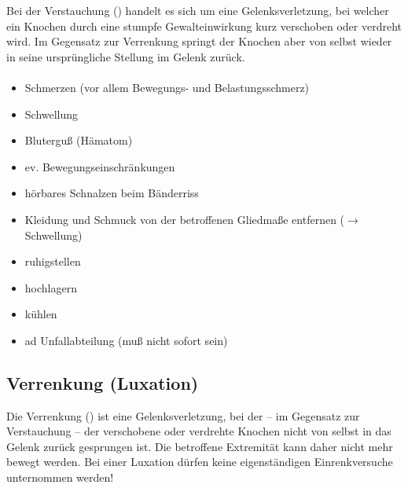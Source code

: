 Bei der Verstauchung () handelt es sich um eine Gelenksverletzung,
bei welcher ein Knochen durch eine stumpfe Gewalteinwirkung kurz verschoben oder
verdreht wird. Im Gegensatz zur Verrenkung springt der Knochen aber von selbst
wieder in seine ursprüngliche Stellung im Gelenk zurück.

\paragraph{\TxSymptome}
\begin{itemize}
  \item Schmerzen (vor allem Bewegungs- und Belastungsschmerz)
  \item Schwellung
  \item Bluterguß (Hämatom)
  \item ev. Bewegungseinschränkungen
  \item hörbares Schnalzen beim Bänderriss
\end{itemize}

{
\begin{itemize}
  \item Kleidung und Schmuck von der betroffenen Gliedmaße entfernen ($\rightarrow$ Schwellung)
  \item ruhigstellen
  \item hochlagern
  \item kühlen
  \item ad Unfallabteilung (muß nicht sofort sein)
\end{itemize}
}





\subsection{Verrenkung (Luxation)}
\label{topic:verrenkung}


Die Verrenkung () ist eine Gelenksverletzung, bei der -- im Gegensatz
zur Verstauchung -- der verschobene oder verdrehte Knochen nicht von selbst in
das Gelenk zurück gesprungen ist. Die betroffene Extremität kann daher nicht mehr
bewegt werden. Bei einer Luxation dürfen keine eigenständigen Einrenkversuche
unternommen werden!

